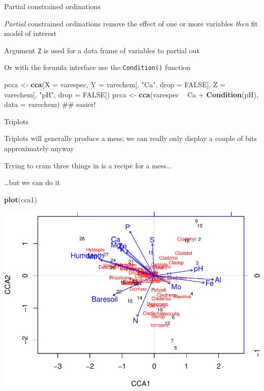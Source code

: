 \documentclass[10pt,ignorenonframetext,compress, aspectratio=169]{beamer}
\newenvironment{Shaded}{\begin{snugshade}}{\end{snugshade}}
\newcommand{\KeywordTok}[1]{\textcolor[rgb]{0.13,0.29,0.53}{\textbf{{#1}}}}
\newcommand{\DataTypeTok}[1]{\textcolor[rgb]{0.13,0.29,0.53}{{#1}}}
\newcommand{\StringTok}[1]{\textcolor[rgb]{0.31,0.60,0.02}{{#1}}}
\newcommand{\OtherTok}[1]{\textcolor[rgb]{0.56,0.35,0.01}{{#1}}}
\newcommand{\NormalTok}[1]{{#1}}
\begin{document}
\begin{frame}[fragile]{Partial constrained ordinations}

\emph{Partial} constrained ordinations remove the effect of one or more
variables \emph{then} fit model of interest

Argument \texttt{Z} is used for a data frame of variables to partial out

Or with the formula interface use the \texttt{Condition()} function

\scriptsize

\begin{Shaded}
\begin{Highlighting}[]
\NormalTok{pcca <-}\StringTok{ }\KeywordTok{cca}\NormalTok{(}\DataTypeTok{X =} \NormalTok{varespec,}
            \DataTypeTok{Y =} \NormalTok{varechem[, }\StringTok{"Ca"}\NormalTok{, }\DataTypeTok{drop =} \OtherTok{FALSE}\NormalTok{],}
            \DataTypeTok{Z =} \NormalTok{varechem[, }\StringTok{"pH"}\NormalTok{, }\DataTypeTok{drop =} \OtherTok{FALSE}\NormalTok{])}
\NormalTok{pcca <-}\StringTok{ }\KeywordTok{cca}\NormalTok{(varespec ~}\StringTok{ }\NormalTok{Ca +}\StringTok{ }\KeywordTok{Condition}\NormalTok{(pH), }\DataTypeTok{data =} \NormalTok{varechem) ## easier!}
\end{Highlighting}
\end{Shaded}

\normalsize

\end{frame}

\begin{frame}[fragile]{Triplots}

Triplots will generally produce a mess; we can really only display a
couple of bits approximately anyway

Trying to cram three things in is a recipe for a mess\ldots{}

\ldots{}but we can do it

\scriptsize

\begin{Shaded}
\begin{Highlighting}[]
\KeywordTok{plot}\NormalTok{(cca1)}
\end{Highlighting}
\end{Shaded}

\begin{center}\includegraphics[width=0.5\linewidth]{vegan-constrained-slides_files/figure-beamer/triplot-1-1} \end{center}

\normalsize

\end{frame}
\end{document}

